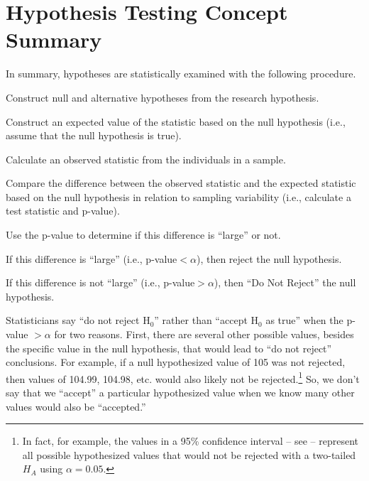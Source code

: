 \documentclass[10pt,openany]{book}\usepackage[]{graphicx}\usepackage[]{color}
\begin{document}
\section{Hypothesis Testing Concept Summary}

In summary, hypotheses are statistically examined with the following procedure.
\vspace{-8pt}
\begin{Enumerate}
  \item Construct null and alternative hypotheses from the research hypothesis.
  \item Construct an expected value of the statistic based on the null hypothesis (i.e., assume that the null hypothesis is true).
  \item Calculate an observed statistic from the individuals in a sample.
  \item Compare the difference between the observed statistic and the expected statistic based on the null hypothesis in relation to sampling variability (i.e., calculate a test statistic and p-value).
  \item Use the p-value to determine if this difference is ``large'' or not.
  \begin{Itemize}
    \item If this difference is ``large'' (i.e., p-value$<\alpha$), then reject the null hypothesis.
    \item If this difference is not ``large'' (i.e., p-value$>\alpha$), then ``Do Not Reject'' the null hypothesis.
  \end{Itemize}
\end{Enumerate}

Statisticians say ``do not reject H$_{0}$'' rather than ``accept H$_{0}$ as true'' when the p-value $>\alpha$ for two reasons. First, there are several other possible values, besides the specific value in the null hypothesis, that would lead to ``do not reject'' conclusions. For example, if a null hypothesized value of 105 was not rejected, then values of 104.99, 104.98, etc. would also likely not be rejected.\footnote{In fact, for example, the values in a 95\% confidence interval -- see  -- represent all possible hypothesized values that would not be rejected with a two-tailed $H_{A}$ using $\alpha=0.05$.}  So, we don't say that we ``accept'' a particular hypothesized value when we know many other values would also be ``accepted.''
\end{document}
